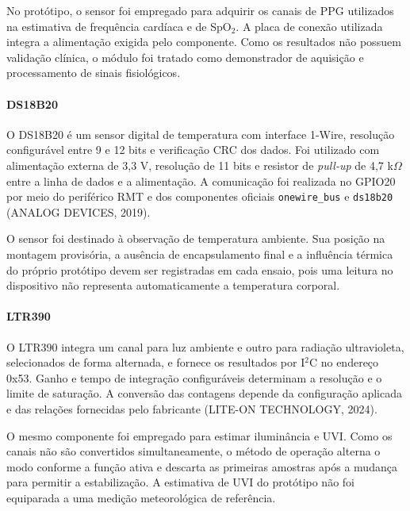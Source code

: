 \documentclass[a4paper,12pt]{article}
\begin{document}
No prot\'otipo, o sensor foi empregado para adquirir os canais de PPG utilizados na estimativa de frequ\^encia card\'iaca e de SpO$_2$. A placa de conex\~ao utilizada integra a alimenta\c{c}\~ao exigida pelo componente. Como os resultados n\~ao possuem valida\c{c}\~ao cl\'inica, o m\'odulo foi tratado como demonstrador de aquisi\c{c}\~ao e processamento de sinais fisiol\'ogicos.


\paragraph{DS18B20}


O DS18B20 \'e um sensor digital de temperatura com interface 1-Wire, resolu\c{c}\~ao configur\'avel entre 9 e 12 bits e verifica\c{c}\~ao CRC dos dados. Foi utilizado com alimenta\c{c}\~ao externa de 3,3 V, resolu\c{c}\~ao de 11 bits e resistor de \emph{pull-up} de 4,7 k$\Omega$ entre a linha de dados e a alimenta\c{c}\~ao. A comunica\c{c}\~ao foi realizada no GPIO20 por meio do perif\'erico RMT e dos componentes oficiais \texttt{onewire\_bus} e \texttt{ds18b20} (ANALOG DEVICES, 2019).


O sensor foi destinado \`a observa\c{c}\~ao de temperatura ambiente. Sua posi\c{c}\~ao na montagem provis\'oria, a aus\^encia de encapsulamento final e a influ\^encia t\'ermica do pr\'oprio prot\'otipo devem ser registradas em cada ensaio, pois uma leitura no dispositivo n\~ao representa automaticamente a temperatura corporal.


\paragraph{LTR390}


O LTR390 integra um canal para luz ambiente e outro para radia\c{c}\~ao ultravioleta, selecionados de forma alternada, e fornece os resultados por I$^2$C no endere\c{c}o 0x53. Ganho e tempo de integra\c{c}\~ao configur\'aveis determinam a resolu\c{c}\~ao e o limite de satura\c{c}\~ao. A convers\~ao das contagens depende da configura\c{c}\~ao aplicada e das rela\c{c}\~oes fornecidas pelo fabricante (LITE-ON TECHNOLOGY, 2024).


O mesmo componente foi empregado para estimar ilumin\^ancia e UVI. Como os canais n\~ao s\~ao convertidos simultaneamente, o m\'etodo de opera\c{c}\~ao alterna o modo conforme a fun\c{c}\~ao ativa e descarta as primeiras amostras ap\'os a mudan\c{c}a para permitir a estabiliza\c{c}\~ao. A estimativa de UVI do prot\'otipo n\~ao foi equiparada a uma medi\c{c}\~ao meteorol\'ogica de refer\^encia.
\end{document}

